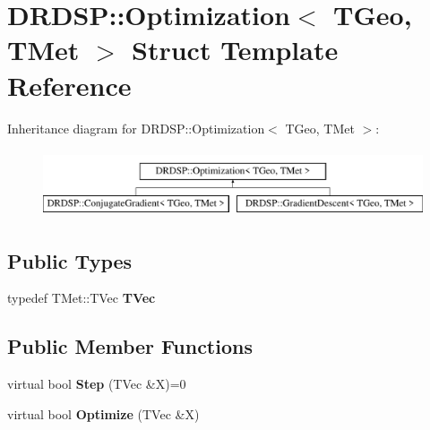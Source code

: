 \hypertarget{struct_d_r_d_s_p_1_1_optimization}{\section{D\-R\-D\-S\-P\-:\-:Optimization$<$ T\-Geo, T\-Met $>$ Struct Template Reference}
\label{struct_d_r_d_s_p_1_1_optimization}
}
Inheritance diagram for D\-R\-D\-S\-P\-:\-:Optimization$<$ T\-Geo, T\-Met $>$\-:\begin{figure}[H]
\begin{center}
\leavevmode
\includegraphics[height=2.000000cm]{struct_d_r_d_s_p_1_1_optimization}
\end{center}
\end{figure}
\subsection*{Public Types}
\begin{DoxyCompactItemize}
\item 
\hypertarget{struct_d_r_d_s_p_1_1_optimization_ad6d026546d45eb190013c6d7645b3694}{typedef T\-Met\-::\-T\-Vec {\bfseries T\-Vec}}\label{struct_d_r_d_s_p_1_1_optimization_ad6d026546d45eb190013c6d7645b3694}

\end{DoxyCompactItemize}
\subsection*{Public Member Functions}
\begin{DoxyCompactItemize}
\item 
\hypertarget{struct_d_r_d_s_p_1_1_optimization_acc45588d4d16e35af8469c93978d9c9a}{virtual bool {\bfseries Step} (T\-Vec \&X)=0}\label{struct_d_r_d_s_p_1_1_optimization_acc45588d4d16e35af8469c93978d9c9a}

\item 
\hypertarget{struct_d_r_d_s_p_1_1_optimization_ac0186a6fcfb176a49b3573728f6b17ce}{virtual bool {\bfseries Optimize} (T\-Vec \&X)}\label{struct_d_r_d_s_p_1_1_optimization_ac0186a6fcfb176a49b3573728f6b17ce}

\end{DoxyCompactItemize}
